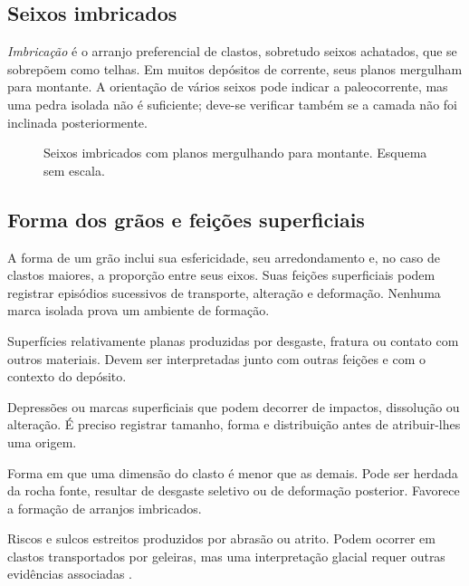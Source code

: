 \subsection{Seixos imbricados}

\emph{Imbricação} é o arranjo preferencial de clastos, sobretudo seixos
achatados, que se sobrepõem como telhas. Em muitos depósitos de corrente,
seus planos mergulham para montante. A orientação de vários seixos pode
indicar a paleocorrente, mas uma pedra isolada não é suficiente; deve-se
verificar também se a camada não foi inclinada posteriormente.

\begin{figure}[htbp]
\centering
{}
\caption{Seixos imbricados com planos mergulhando para montante.
Esquema sem escala.}
\label{fig:seixos-imbricados}
\end{figure}

\subsection{Forma dos grãos e feições superficiais}

A forma de um grão inclui sua esfericidade, seu arredondamento e, no caso
de clastos maiores, a proporção entre seus eixos. Suas feições superficiais
podem registrar episódios sucessivos de transporte, alteração e deformação.
Nenhuma marca isolada prova um ambiente de formação.

\begin{description}[leftmargin=2.7cm,style=nextline]
  \item[Facetas] Superfícies relativamente planas produzidas por desgaste,
  fratura ou contato com outros materiais. Devem ser interpretadas junto
  com outras feições e com o contexto do depósito.
  \item[Cavidades] Depressões ou marcas superficiais que podem decorrer de
  impactos, dissolução ou alteração. É preciso registrar tamanho, forma e
  distribuição antes de atribuir-lhes uma origem.
  \item[Achatamento] Forma em que uma dimensão do clasto é menor que as
  demais. Pode ser herdada da rocha fonte, resultar de desgaste seletivo ou
  de deformação posterior. Favorece a formação de arranjos imbricados.
  \item[Estrias] Riscos e sulcos estreitos produzidos por abrasão ou atrito.
  Podem ocorrer em clastos transportados por geleiras, mas uma interpretação
  glacial requer outras evidências associadas
  \autocite{trosdtorf2005glacial}.
\end{description}

